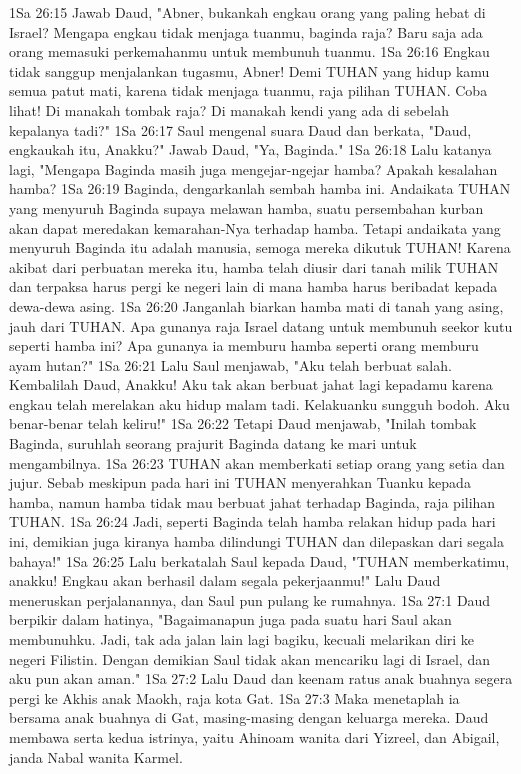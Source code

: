 1Sa 26:15  Jawab Daud, "Abner, bukankah engkau orang yang paling hebat di Israel? Mengapa engkau tidak menjaga tuanmu, baginda raja? Baru saja ada orang memasuki perkemahanmu untuk membunuh tuanmu.
1Sa 26:16  Engkau tidak sanggup menjalankan tugasmu, Abner! Demi TUHAN yang hidup kamu semua patut mati, karena tidak menjaga tuanmu, raja pilihan TUHAN. Coba lihat! Di manakah tombak raja? Di manakah kendi yang ada di sebelah kepalanya tadi?"
1Sa 26:17  Saul mengenal suara Daud dan berkata, "Daud, engkaukah itu, Anakku?" Jawab Daud, "Ya, Baginda."
1Sa 26:18  Lalu katanya lagi, "Mengapa Baginda masih juga mengejar-ngejar hamba? Apakah kesalahan hamba?
1Sa 26:19  Baginda, dengarkanlah sembah hamba ini. Andaikata TUHAN yang menyuruh Baginda supaya melawan hamba, suatu persembahan kurban akan dapat meredakan kemarahan-Nya terhadap hamba. Tetapi andaikata yang menyuruh Baginda itu adalah manusia, semoga mereka dikutuk TUHAN! Karena akibat dari perbuatan mereka itu, hamba telah diusir dari tanah milik TUHAN dan terpaksa harus pergi ke negeri lain di mana hamba harus beribadat kepada dewa-dewa asing.
1Sa 26:20  Janganlah biarkan hamba mati di tanah yang asing, jauh dari TUHAN. Apa gunanya raja Israel datang untuk membunuh seekor kutu seperti hamba ini? Apa gunanya ia memburu hamba seperti orang memburu ayam hutan?"
1Sa 26:21  Lalu Saul menjawab, "Aku telah berbuat salah. Kembalilah Daud, Anakku! Aku tak akan berbuat jahat lagi kepadamu karena engkau telah merelakan aku hidup malam tadi. Kelakuanku sungguh bodoh. Aku benar-benar telah keliru!"
1Sa 26:22  Tetapi Daud menjawab, "Inilah tombak Baginda, suruhlah seorang prajurit Baginda datang ke mari untuk mengambilnya.
1Sa 26:23  TUHAN akan memberkati setiap orang yang setia dan jujur. Sebab meskipun pada hari ini TUHAN menyerahkan Tuanku kepada hamba, namun hamba tidak mau berbuat jahat terhadap Baginda, raja pilihan TUHAN.
1Sa 26:24  Jadi, seperti Baginda telah hamba relakan hidup pada hari ini, demikian juga kiranya hamba dilindungi TUHAN dan dilepaskan dari segala bahaya!"
1Sa 26:25  Lalu berkatalah Saul kepada Daud, "TUHAN memberkatimu, anakku! Engkau akan berhasil dalam segala pekerjaanmu!" Lalu Daud meneruskan perjalanannya, dan Saul pun pulang ke rumahnya.
1Sa 27:1  Daud berpikir dalam hatinya, "Bagaimanapun juga pada suatu hari Saul akan membunuhku. Jadi, tak ada jalan lain lagi bagiku, kecuali melarikan diri ke negeri Filistin. Dengan demikian Saul tidak akan mencariku lagi di Israel, dan aku pun akan aman."
1Sa 27:2  Lalu Daud dan keenam ratus anak buahnya segera pergi ke Akhis anak Maokh, raja kota Gat.
1Sa 27:3  Maka menetaplah ia bersama anak buahnya di Gat, masing-masing dengan keluarga mereka. Daud membawa serta kedua istrinya, yaitu Ahinoam wanita dari Yizreel, dan Abigail, janda Nabal wanita Karmel.
